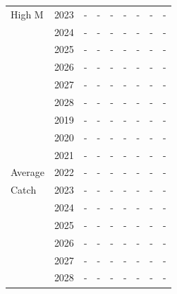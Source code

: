 \documentclass[12pt,]{article}
\begin{document}
\begin{table}[ht]
{\begin{tabular}{l|cc|>{\centering}p{.7in}c|>{\centering}p{.7in}c|>{\centering}p{.7in}c}
  High M & 2023 & - & - & - & - & - & - & - \\ 
   & 2024 & - & - & - & - & - & - & - \\ 
   & 2025 & - & - & - & - & - & - & - \\ 
   & 2026 & - & - & - & - & - & - & - \\ 
   & 2027 & - & - & - & - & - & - & - \\ 
   & 2028 & - & - & - & - & - & - & - \\ 
   \hline
 & 2019 & - & - & - & - & - & - & - \\ 
   & 2020 & - & - & - & - & - & - & - \\ 
   & 2021 & - & - & - & - & - & - & - \\ 
  Average & 2022 & - & - & - & - & - & - & - \\ 
  Catch & 2023 & - & - & - & - & - & - & - \\ 
   & 2024 & - & - & - & - & - & - & - \\ 
   & 2025 & - & - & - & - & - & - & - \\ 
   & 2026 & - & - & - & - & - & - & - \\ 
   & 2027 & - & - & - & - & - & - & - \\ 
   & 2028 & - & - & - & - & - & - & - \\ 
   \hline
\end{tabular}
}
\end{table}\begin{table}[ht]
\centering
\caption{Summary of 10-year projections 
                                                  beginning in 2018 for 
                                                  alternate states of nature based 
                                                  on an axis of uncertainty for the Southern model.  Columns range over low, 
                                                  mid, and high states of nature, and rows 
                                                  range over different assumptions of catch 
                                                  levels. An entry of "--" indicates that the 
                                                  stock is driven to very low abundance under the
                                                  particular scenario.} 
\label{tab:Decision_table_mod2}
\end{table}
\end{document}
